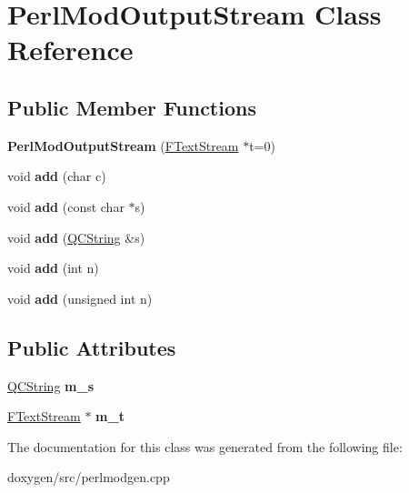 \hypertarget{class_perl_mod_output_stream}{}\section{Perl\+Mod\+Output\+Stream Class Reference}
\label{class_perl_mod_output_stream}
\subsection*{Public Member Functions}
\begin{DoxyCompactItemize}
\item 
\mbox{\label{class_perl_mod_output_stream_a74b0ce7dc1e91181e3b145c6bd51239b}} 
{\bfseries Perl\+Mod\+Output\+Stream} (\mbox{\hyperlink{class_f_text_stream}{F\+Text\+Stream}} $\ast$t=0)
\item 
\mbox{\label{class_perl_mod_output_stream_a6970acf3298a0e408427b54d1b876cd5}} 
void {\bfseries add} (char c)
\item 
\mbox{\label{class_perl_mod_output_stream_a3551835e035096e026776c6182fbd2e0}} 
void {\bfseries add} (const char $\ast$s)
\item 
\mbox{\label{class_perl_mod_output_stream_a1bc1bba39566a20570d070a8047b4dd9}} 
void {\bfseries add} (\mbox{\hyperlink{class_q_c_string}{Q\+C\+String}} \&s)
\item 
\mbox{\label{class_perl_mod_output_stream_ab7ddab3bb38de8bf835a62895a792ff8}} 
void {\bfseries add} (int n)
\item 
\mbox{\label{class_perl_mod_output_stream_aad5e9dc80caeb48eb84de1a1ef190136}} 
void {\bfseries add} (unsigned int n)
\end{DoxyCompactItemize}
\subsection*{Public Attributes}
\begin{DoxyCompactItemize}
\item 
\mbox{\label{class_perl_mod_output_stream_abd23a5e420b365f3239937fd5091a19c}} 
\mbox{\hyperlink{class_q_c_string}{Q\+C\+String}} {\bfseries m\+\_\+s}
\item 
\mbox{\label{class_perl_mod_output_stream_a0000b5406fb4590ed62996f43ad3a192}} 
\mbox{\hyperlink{class_f_text_stream}{F\+Text\+Stream}} $\ast$ {\bfseries m\+\_\+t}
\end{DoxyCompactItemize}


The documentation for this class was generated from the following file\+:\begin{DoxyCompactItemize}
\item 
doxygen/src/perlmodgen.\+cpp\end{DoxyCompactItemize}
